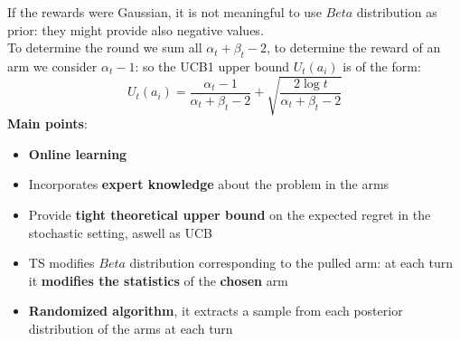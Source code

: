     If the rewards were Gaussian, it is not meaningful to use $Beta$ distribution as prior: they might provide also negative values.\\
    To determine the round we sum all $\alpha_t+\beta_t-2$, to determine the reward of an arm we consider $\alpha_t-1$: so the UCB1 upper bound $U_t(a_i)$ is of the form:
    $$U_t(a_i)=\frac{\alpha_t-1}{\alpha_t+\beta_t-2}+\sqrt{\frac{2\log t}{\alpha_t+\beta_t-2}}$$
    \textbf{Main points}:
    \begin{itemize}
        \item \textbf{Online learning}
        \item Incorporates \textbf{expert knowledge} about the problem in the arms
        \item Provide \textbf{tight theoretical upper bound} on the expected regret in the stochastic setting, aswell as UCB
        \item TS modifies $Beta$ distribution corresponding to the pulled arm: at each turn it \textbf{modifies the statistics} of the \textbf{chosen} arm
        \item \textbf{Randomized algorithm}, it extracts a sample from each posterior distribution of the arms at each turn
    \end{itemize}

